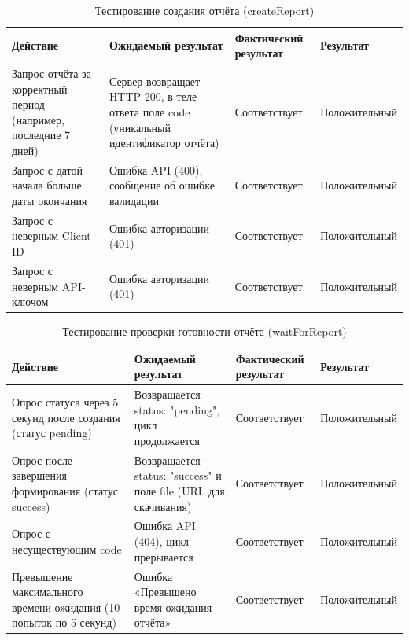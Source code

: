 \begin{table}[!htb]
\caption{\label{tab:testCreateReport}Тестирование создания отчёта (createReport)}
\small
\begin{tabular}{|p{4cm}|p{4cm}|p{3cm}|p{4cm}|}
\hline
Действие & Ожидаемый результат & Фактический результат & Результат \\ \hline
Запрос отчёта за корректный период (например, последние 7 дней) & Сервер возвращает HTTP 200, в теле ответа поле code (уникальный идентификатор отчёта) & Соответствует & Положительный \\ \hline
Запрос с датой начала больше даты окончания & Ошибка API (400), сообщение об ошибке валидации & Соответствует & Положительный \\ \hline
Запрос с неверным Client ID & Ошибка авторизации (401) & Соответствует & Положительный \\ \hline
Запрос с неверным API-ключом & Ошибка авторизации (401) & Соответствует & Положительный \\ \hline
\end{tabular}
\end{table}

\begin{table}[!htb]
\caption{\label{tab:testWaitForReport}Тестирование проверки готовности отчёта (waitForReport)}
\small
\begin{tabular}{|p{4cm}|p{4cm}|p{3cm}|p{4cm}|}
\hline
Действие & Ожидаемый результат & Фактический результат & Результат \\ \hline
Опрос статуса через 5 секунд после создания (статус pending) & Возвращается status: "pending", цикл продолжается & Соответствует & Положительный \\ \hline
Опрос после завершения формирования (статус success) & Возвращается status: "success" и поле file (URL для скачивания) & Соответствует & Положительный \\ \hline
Опрос с несуществующим code & Ошибка API (404), цикл прерывается & Соответствует & Положительный \\ \hline
Превышение максимального времени ожидания (10 попыток по 5 секунд) & Ошибка «Превышено время ожидания отчёта» & Соответствует & Положительный \\ \hline
\end{tabular}
\end{table}



